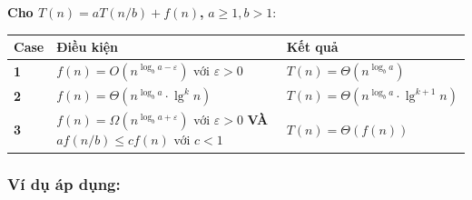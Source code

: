 \documentclass[10pt]{article}
\newcounter{none}
\begin{document}
\textbf{Cho \(T(n) = aT(n/b) + f(n)\),} \(a \geq 1, b > 1\):

{\def\LTcaptype{none} %
\begin{longtable}[]{@{}
  >{\raggedright\arraybackslash}p{}
  >{\raggedright\arraybackslash}p{}
  >{\raggedright\arraybackslash}p{}@{}}
\toprule\noalign{}
\begin{minipage}[b]{\linewidth}\raggedright
Case
\end{minipage} & \begin{minipage}[b]{\linewidth}\raggedright
Điều kiện
\end{minipage} & \begin{minipage}[b]{\linewidth}\raggedright
Kết quả
\end{minipage} \\
\midrule\noalign{}
\endhead
\bottomrule\noalign{}
\endlastfoot
\textbf{1} & \(f(n) = O(n^{\log_b a - \varepsilon})\) với
\(\varepsilon > 0\) & \(T(n) = \Theta(n^{\log_b a})\) \\
\textbf{2} & \(f(n) = \Theta(n^{\log_b a} \cdot \lg^k n)\) &
\(T(n) = \Theta(n^{\log_b a} \cdot \lg^{k+1} n)\) \\
\textbf{3} & \(f(n) = \Omega(n^{\log_b a + \varepsilon})\) với
\(\varepsilon > 0\) \textbf{VÀ} \(a f(n/b) \leq c f(n)\) với \(c < 1\) &
\(T(n) = \Theta(f(n))\) \\
\end{longtable}
}
\label{tab:master-theorem}

\subsubsection{Ví dụ áp dụng:}\label{vuxed-dux1ee5-uxe1p-dux1ee5ng}
\end{document}
